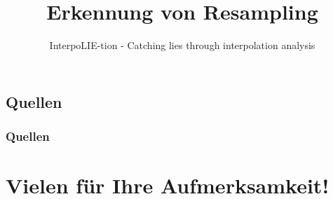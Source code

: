 \documentclass[11pt,t,usepdftitle=false,aspectratio=169]{beamer}
\begin{document}
\subsection{Quellen}
\begin{frame}
	\frametitle{Quellen}
	\printbibliography[heading=none]
\end{frame}

\title[Erkennung von Resampling]{Erkennung von Resampling}
\subtitle{InterpoLIE-tion - Catching lies through interpolation analysis}
\section{Vielen für Ihre Aufmerksamkeit!}
\end{document}
